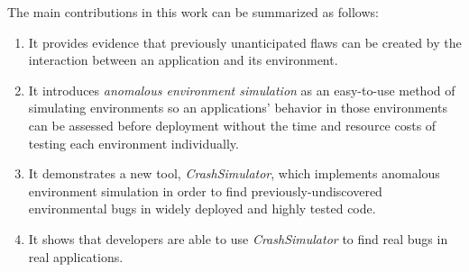 
The main contributions in this work can be summarized as follows:

\begin{enumerate}

\item{It provides evidence
that previously unanticipated flaws can be created by the interaction
between an application and its environment.}

\item{It introduces \textit{anomalous environment simulation}
as an easy-to-use method of simulating environments
so an applications' behavior in those environments
can be assessed before deployment
without the time and resource costs of
testing each environment individually.}

\item{It demonstrates a new tool, {\em CrashSimulator},
which implements anomalous environment simulation
in order to find previously-undiscovered environmental bugs
in widely deployed and highly tested code.}

\item{It shows that developers are able
to use {\em CrashSimulator}
to find real bugs in real applications.}

\end{enumerate}
